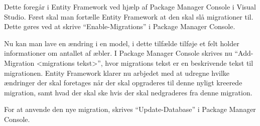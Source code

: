 Dette foregår i Entity Framework ved hjælp af Package Manager Console i Visual Studio. Først skal man fortælle Entity Framework at den skal slå migrationer til. Dette gøres ved at skrive \enquote{Enable-Migrations} i Package Manager Console.

Nu kan man lave en ændring i en model, i dette tilfælde tilføje et felt holder informationer om antallet af æbler. I Package Manager Console skrives nu \enquote{Add-Migration <migrations tekst>}, hvor migrations tekst er en beskrivende tekst til migrationen. Entity Framework klarer nu arbjedet med at udregne hvilke ændringer der skal foretages når der skal opgraderes til denne nyligt kreerede migration, samt hvad der skal ske hvis der skal nedgraderes fra denne migration.

For at anvende den nye migration, skrives \enquote{Update-Database} i Package Manager Console.
